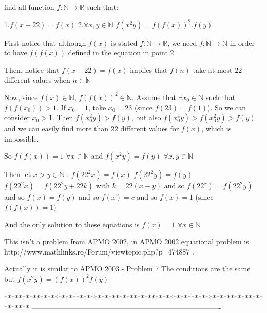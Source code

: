 \begin{mysolution}
	\begin{tcolorbox}find all function $ f: \mathbb{N}\rightarrow \mathbb{R}$ such that:

1.$ f(x + 22) = f(x)$
2.$ \forall x,y \in \mathbb{N}$   $ f(x^2y) = f(f(x))^2.f(y)$\end{tcolorbox}

First notice that although $ f(x)$ is stated $ f: \mathbb{N}\rightarrow \mathbb{R}$, we need $ f: \mathbb{N}\rightarrow \mathbb{N}$ in order to have $ f(f(x))$ defined in the equation in point 2.

Then, notice that $ f(x + 22) = f(x)$ implies that $ f(n)$ take at most $ 22$ different values when $ n\in\mathbb{N}$

Now, since $ f(x)\in\mathbb{N}$, $ f(f(x))^2\in\mathbb{N}$. Assume that $ \exists x_0\in\mathbb{N}$ such that $ f(f(x_0))>1$. If $ x_0=1$, take $ x_0=23$ (since $ f(23)=f(1)$). So we can consider $ x_0>1$. Then $ f(x_0^2y)>f(y)$, but also $ f(x_0^4y)>f(x_0^2y)>f(y)$ and we can easily find more than $ 22$ different values for $ f(x)$, which is impossible.

So $ f(f(x))=1$ $ \forall x\in\mathbb{N}$ and $ f(x^2y)=f(y)$ $ \forall x,y\in\mathbb{N}$

Then let $ x>y\in\mathbb{N}$ :
$ f(22^2x)=f(x)$
$ f(22^2y)=f(y)$
$ f(22^2x)=f(22^2y+22k)$ with $ k=22(x-y)$ and so $ f(22^x)=f(22^2y)$ and so $ f(x)=f(y)$ and so $ f(x)=c$ and so $ f(x)=1$ (since $ f(f(x))=1$)

And the only solution to these equations is $ f(x)=1$ $ \forall x\in\mathbb{N}$
\end{mysolution}



\begin{mysolution}
	This isn't a problem from APMO 2002, in APMO 2002 equational problem is http://www.mathlinks.ro/Forum/viewtopic.php?p=474887 .
\end{mysolution}



\begin{mysolution}
	Actually it is similar to APMO 2003 - Problem 7
The conditions are the same but $ f(x^2y)=(f(x))^2f(y)$
\end{mysolution}
*******************************************************************************
-------------------------------------------------------------------------------

